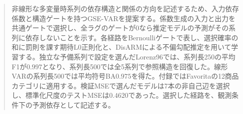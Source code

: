 \begin{abstract}
非線形な多変量時系列の依存構造と関係の方向を記述するため、入力依存係数と構造ゲートを持つGSE-VARを提案する。係数生成の入力と出力を共通ゲートで選択し、全ラグのゲートが\(0\)なら推定モデルの予測がその系列に依存しないことを示す。各経路をBernoulliゲートで表し、選択確率の和に罰則を課す期待L0正則化と、DisARMによる不偏勾配推定を用いて学習する。独立な予備系列で設定を選んだLorenz96では、系列長250の平均F1が\(0.997\)となり、系列長500では全5系列で参照構造を回復した。線形VARの系列長500では平均符号BA\(0.975\)を得た。付録ではFavoritaの12商品カテゴリに適用する。検証MSEで選んだモデルは7本の非自己辺を選択し、標準化尺度のテストMSEは\(0.4620\)であった。選択した経路を、観測条件下の予測依存として記述する。
\end{abstract}
